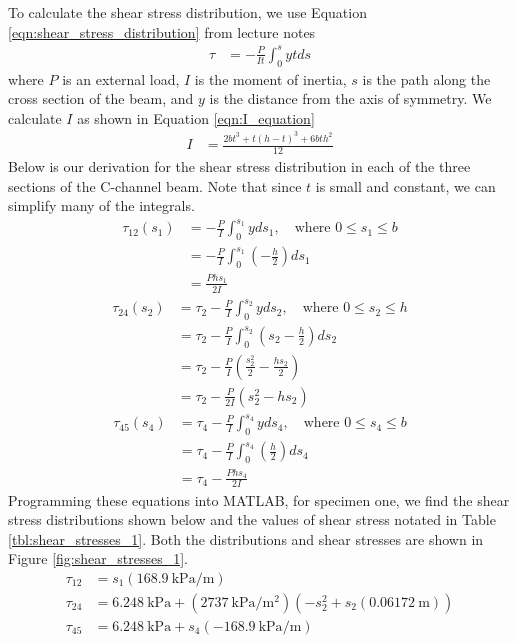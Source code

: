 \documentclass[12 pt]{report}
\begin{document}
To calculate the shear stress distribution, we use Equation \ref{eqn:shear_stress_distribution} from lecture notes \cite{lecture_notes}
\begin{align} \label{eqn:shear_stress_distribution}
	\tau&=-\frac{P}{It}\int_0^sytds
\end{align}
where $P$ is an external load, $I$ is the moment of inertia, $s$ is the path along the cross section of the beam, and $y$ is the distance from the axis of symmetry. We calculate $I$ as shown in Equation \ref{eqn:I_equation}
\begin{align} \label{eqn:I_equation}
	I&=\frac{2bt^3+t(h-t)^3+6bth^2}{12}
\end{align}
Below is our derivation for the shear stress distribution in each of the three sections of the C-channel beam. Note that since $t$ is small and constant, we can simplify many of the integrals.
\begin{align*}
	\tau_{12}(s_1)&=-\frac{P}{I}\int_0^{s_1}yds_1,\quad\text{where }0\le{}s_1\le{}b\\
	&=-\frac{P}{I}\int_0^{s_1}\left(-\frac{h}{2}\right)ds_1\\
	&=\frac{Phs_1}{2I}
\end{align*}
\begin{align*}
	\tau_{24}(s_2)&=\tau_2-\frac{P}{I}\int_0^{s_2}yds_2,\quad\text{where }0\le{}s_2\le{}h\\
	&=\tau_2-\frac{P}{I}\int_0^{s_2}\left(s_2-\frac{h}{2}\right)ds_2\\
	&=\tau_2-\frac{P}{I}\left(\frac{s_2^2}{2}-\frac{hs_2}{2}\right)\\
	&=\tau_2-\frac{P}{2I}(s_2^2-hs_2)
\end{align*}
\begin{align*}
	\tau_{45}(s_4)&=\tau_4-\frac{P}{I}\int_0^{s_4}yds_4,\quad\text{where }0\le{}s_4\le{}b\\
	&=\tau_4-\frac{P}{I}\int_0^{s_4}\left(\frac{h}{2}\right)ds_4\\
	&=\tau_4-\frac{Phs_4}{2I}
\end{align*}
Programming these equations into MATLAB, for specimen one, we find the shear stress distributions shown below and the values of shear stress notated in Table \ref{tbl:shear_stresses_1}. Both the distributions and shear stresses are shown in Figure \ref{fig:shear_stresses_1}.
\begin{align*}
	\tau_{12}&=s_1(\qty{168.9}{\kilo\pascal\per\meter})\\
	\tau_{24}&=\qty{6.248}{\kilo\pascal}+(\qty{2737}{\kilo\pascal\per\meter\squared})(-s_2^2+s_2(\qty{0.06172}{\meter}))\\
	\tau_{45}&=\qty{6.248}{\kilo\pascal}+s_4(\qty{-168.9}{\kilo\pascal\per\meter})
\end{align*}
\end{document}
